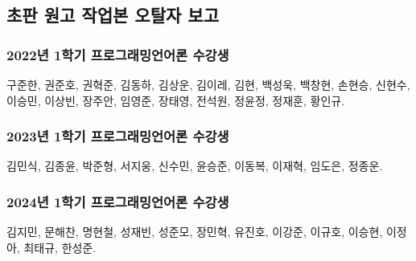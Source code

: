 \subsection{초판 원고 작업본 오탈자 보고}
\subsubsection{2022년 1학기 프로그래밍언어론 수강생}
구준한, 권준호, 권혁준, 김동하, 김상운, 김이레, 김현, 백성욱, 백창현, 손현승,
신현수, 이승민, 이상빈, 장주안, 임영준, 장태영, 전석원, 정윤정, 정재훈, 황인규.

\subsubsection{2023년 1학기 프로그래밍언어론 수강생}
김민식, 김종윤, 박준형, 서지웅, 신수민, 윤승준, 이동복, 이재혁, 임도은, 정종운.

\subsubsection{2024년 1학기 프로그래밍언어론 수강생}
김지민, 문해찬, 명현철, 성재빈, 성준모, 장민혁, 유진호, 이강준, 이규호, 이승현, 이정아, 최태규, 한성준.

\begin{comment}
\newpage

\section{다음 판에 추가할지 고려중인 주제}
\subsection{Control}
Continuation-Passing Style,
Delimited Continuations,
Coroutines, Exceptions, Async-Await,
Algebraic Effects,
Functor/Applicative/Monad/Monoid/...

\url{https://www.microsoft.com/en-us/research/wp-content/uploads/2016/08/algeff-tr-2016-v2.pdf}

\subsection{Staged Computation}
Interpreter vs. Compiler, Futamura Projections, Partial Evaluation

\end{comment}


